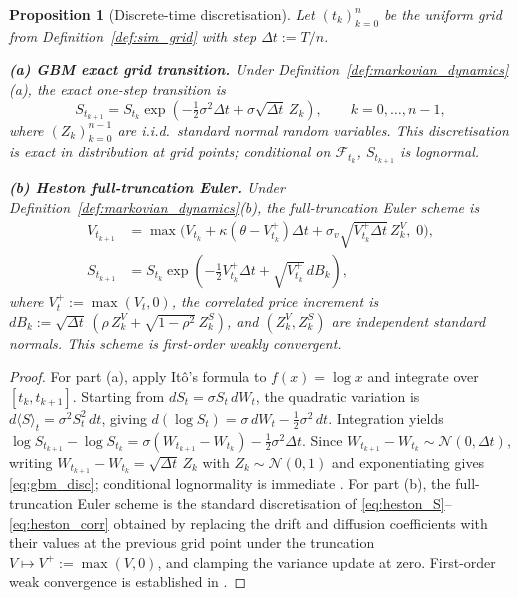 \documentclass[12pt,a4paper]{article}
\theoremstyle{definition}
\theoremstyle{plain}
\newtheorem{proposition}{Proposition}[section]
\theoremstyle{remark}
\theoremstyle{plain}
\begin{document}
\begin{proposition}[Discrete-time discretisation]
\label{prop:markovian_disc}
\label{prop:gbm_exact_transition}
Let $(t_k)_{k=0}^n$ be the uniform grid from Definition~\ref{def:sim_grid}
with step $\Delta t := T/n$.

\textbf{(a) GBM exact grid transition.} Under
Definition~\ref{def:markovian_dynamics}(a), the exact one-step transition is
\begin{equation}\label{eq:gbm_disc}
  S_{t_{k+1}} = S_{t_k} \exp\!\left(-\tfrac{1}{2}\sigma^2 \Delta t
  + \sigma \sqrt{\Delta t}\, Z_k\right),
  \qquad k = 0, \ldots, n-1,
\end{equation}
where $(Z_k)_{k=0}^{n-1}$ are i.i.d.\ standard normal random variables.
This discretisation is exact in distribution at grid points; conditional on
$\mathcal{F}_{t_k}$, $S_{t_{k+1}}$ is lognormal.

\textbf{(b) Heston full-truncation Euler.} Under
Definition~\ref{def:markovian_dynamics}(b), the full-truncation Euler scheme
\cite{LordKoekkoekVanDijk2010} is
\begin{align}
  V_{t_{k+1}} &= \max\!\Big( V_{t_k}
  + \kappa(\theta - V_{t_k}^+)\Delta t
  + \sigma_v \sqrt{V_{t_k}^+ \Delta t}\, Z^V_k,\; 0 \Big),
  \label{eq:heston_disc_V}\\
  S_{t_{k+1}} &= S_{t_k} \exp\!\left(-\tfrac{1}{2}V_{t_k}^+ \Delta t
  + \sqrt{V_{t_k}^+}\, dB_k\right), \label{eq:heston_disc_S}
\end{align}
where $V_t^+ := \max(V_t, 0)$, the correlated price increment is
$dB_k := \sqrt{\Delta t}\,(\rho\, Z^V_k + \sqrt{1-\rho^2}\, Z^S_k)$, and
$(Z^V_k, Z^S_k)$ are independent standard normals. This scheme is first-order
weakly convergent.
\end{proposition}

\begin{proof}
For part (a), apply It\^o's formula to $f(x)=\log x$ and integrate over
$[t_k,t_{k+1}]$. Starting from $dS_t=\sigma S_t\,dW_t$, the quadratic variation
is $d\langle S\rangle_t=\sigma^2 S_t^2\,dt$, giving
$d(\log S_t)=\sigma\,dW_t-\tfrac12\sigma^2\,dt$. Integration yields
$\log S_{t_{k+1}}-\log S_{t_k}=\sigma(W_{t_{k+1}}-W_{t_k})-\tfrac12\sigma^2\Delta t$.
Since $W_{t_{k+1}}-W_{t_k}\sim\mathcal N(0,\Delta t)$, writing
$W_{t_{k+1}}-W_{t_k}=\sqrt{\Delta t}\,Z_k$ with $Z_k\sim\mathcal N(0,1)$ and
exponentiating gives \eqref{eq:gbm_disc}; conditional lognormality is
immediate \cite{BlackScholes1973}.
For part (b), the full-truncation Euler scheme is the standard discretisation
of \eqref{eq:heston_S}--\eqref{eq:heston_corr} obtained by replacing the drift
and diffusion coefficients with their values at the previous grid point under
the truncation $V\mapsto V^+:=\max(V,0)$, and clamping the variance update at
zero. First-order weak convergence is established in
\cite{LordKoekkoekVanDijk2010}.
\end{proof}
\end{document}
